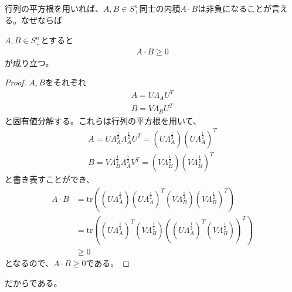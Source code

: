 行列の平方根を用いれば、$A, B \in S_+^n$同士の内積$A \cdot B$は非負になることが言える。なぜならば
\begin{theorem} \label{SemidefiniteInnerProduct}
  $A, B \in S_+^n$とすると
  \begin{align*}
    A \cdot B \geq 0
  \end{align*}
  が成り立つ。
\end{theorem}
\begin{proof}
  $A, B$をそれぞれ
  \begin{align*}
    A = U \Lambda_A U^T \\
    B = V \Lambda_B U^T
  \end{align*}
  と固有値分解する。これらは行列の平方根を用いて、
  \begin{align*}
    A = U \Lambda_A^\frac{1}{2} \Lambda_A^\frac{1}{2} U^T = \left(U \Lambda_A^\frac{1}{2}\right) \left(U \Lambda_A^\frac{1}{2}\right)^T\\
    B = V \Lambda_B^\frac{1}{2} \Lambda_A^\frac{1}{2} V^T = \left(V \Lambda_B^\frac{1}{2}\right) \left(V \Lambda_B^\frac{1}{2}\right)^T
  \end{align*}
  と書き表すことができ、
  \begin{align*}
    A \cdot B & = \mathrm{tr}\left(\left(U \Lambda_A^\frac{1}{2}\right) \left(U \Lambda_A^\frac{1}{2}\right)^T \left(V \Lambda_B^\frac{1}{2}\right) \left(V \Lambda_B^\frac{1}{2}\right)^T\right) \\
              & = \mathrm{tr}\left(\left(U \Lambda_A^\frac{1}{2}\right)^T \left(V \Lambda_B^\frac{1}{2}\right) \left(\left(U \Lambda_A^\frac{1}{2}\right)^T \left(V \Lambda_B^\frac{1}{2}\right)\right)^T\right) \\
              & \geq 0
  \end{align*}
  となるので、$A \cdot B \geq 0$である。
\end{proof}
だからである。
